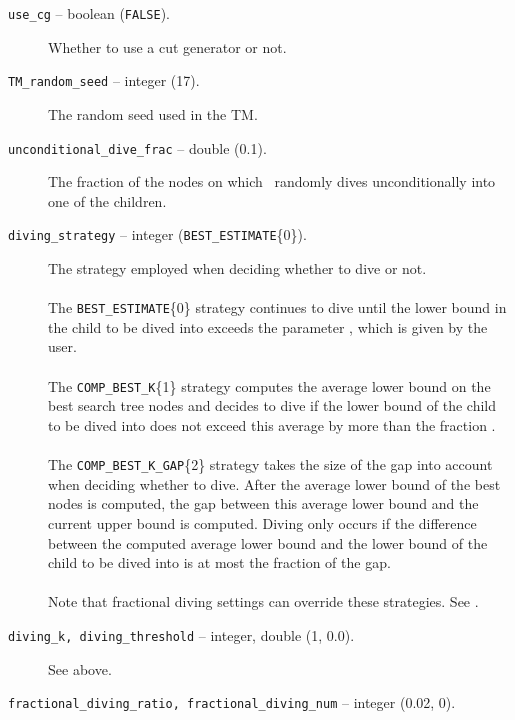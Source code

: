 \begin{description}
\item[{\tt use\_cg} -- boolean ({\tt FALSE}).]
Whether to use a cut generator or not. 

\item[{\tt TM\_random\_seed} -- integer (17).]
The random seed used in the TM.

\item[{\tt unconditional\_dive\_frac} -- double (0.1).]
The fraction of the nodes on which \BB\ randomly dives
unconditionally into one of the children.

\label{diving_strategy}
\item[{\tt diving\_strategy} -- integer ({\tt BEST\_ESTIMATE}\{0\}).]
The strategy employed when deciding whether to dive or not. \\
\\
The {\tt BEST\_ESTIMATE}\{0\} strategy continues to dive until the
lower bound in the child to be dived into exceeds the parameter
, which is 
given by the user. \\
\\
The {\tt COMP\_BEST\_K}\{1\} strategy computes the average lower bound
on the best  search tree nodes and
decides to dive if
the lower bound of the child to be dived into does not exceed this
average by more than the fraction .
\\
\\
The {\tt COMP\_BEST\_K\_GAP}\{2\} strategy takes the size of the gap
into account when deciding whether to dive. After the average lower
bound of the best  nodes is computed, 
the gap between
this average lower bound and the current upper bound is computed.
Diving only occurs if the difference between the computed average
lower bound and the lower bound of the child to be dived into is at
most the fraction  of the gap.\\
\\
Note that fractional diving settings can override these strategies.
See .

\label{diving}
\item[{\texttt{diving\_k, diving\_threshold}} -- integer, double (1, 0.0).]
See above.

\label{fractional_diving}
\item[{\tt fractional\_diving\_ratio, fractional\_diving\_num} --
integer (0.02, 0).]


\end{description}
